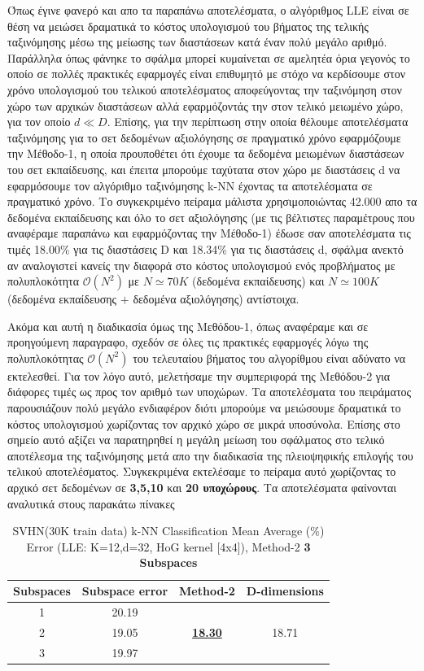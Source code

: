 \par
Όπως έγινε φανερό και απο τα παραπάνω αποτελέσματα, ο αλγόριθμος \textlatin{LLE} είναι σε θέση να μειώσει δραματικά το κόστος υπολογισμού του βήματος της τελικής ταξινόμησης μέσω της μείωσης των διαστάσεων κατά έναν πολύ μεγάλο αριθμό. Παράλληλα όπως φάνηκε το σφάλμα μπορεί κυμαίνεται σε αμελητέα όρια γεγονός το οποίο σε πολλές πρακτικές εφαρμογές είναι επιθυμητό με στόχο να κερδίσουμε στον χρόνο υπολογισμού του τελικού αποτελέσματος αποφεύγοντας την ταξινόμηση στον χώρο των αρχικών διαστάσεων αλλά εφαρμόζοντάς την στον τελικό μειωμένο χώρο, για τον οποίο $d \ll D$. Επίσης, για την περίπτωση στην οποία θέλουμε αποτελέσματα ταξινόμησης για το σετ δεδομένων αξιολόγησης σε πραγματικό χρόνο εφαρμόζουμε την Μέθοδο-1, η οποία προυποθέτει ότι έχουμε τα δεδομένα μειωμένων διαστάσεων του σετ εκπαίδευσης, και έπειτα μπορούμε ταχύτατα στον χώρο με διαστάσεις \textlatin{d} να εφαρμόσουμε τον αλγόριθμο ταξινόμησης \textlatin{k-NN} έχοντας τα αποτελέσματα σε πραγματικό χρόνο. Το συγκεκριμένο πείραμα μάλιστα χρησιμοποιώντας 42.000 απο τα δεδομένα εκπαίδευσης και όλο το σετ αξιολόγησης (με τις βέλτιστες παραμέτρους που αναφέραμε παραπάνω και εφαρμόζοντας την Μέθοδο-1) έδωσε σαν αποτελέσματα τις τιμές 18.00\% για τις διαστάσεις \textlatin{D} και 18.34\% για τις διαστάσεις \textlatin{d}, σφάλμα ανεκτό αν αναλογιστεί κανείς την διαφορά στο κόστος υπολογισμού ενός προβλήματος με πολυπλοκότητα $ \mathcal{O}(N^2)$ με $N \simeq 70K$ (δεδομένα εκπαίδευσης) και $N \simeq 100K$ (δεδομένα εκπαίδευσης $+$ δεδομένα αξιολόγησης) αντίστοιχα.
\par
Ακόμα και αυτή η διαδικασία όμως της Μεθόδου-1, όπως αναφέραμε και σε προηγούμενη παραγραφο, σχεδόν σε όλες τις πρακτικές εφαρμογές λόγω της πολυπλοκότητας $ \mathcal{O}(N^2)$  του τελευταίου βήματος του αλγορίθμου είναι αδύνατο να εκτελεσθεί. Για τον λόγο αυτό, μελετήσαμε την συμπεριφορά της Μεθόδου-2 για διάφορες τιμές ως προς τον αριθμό των υποχώρων. Τα αποτελέσματα του πειράματος παρουσιάζουν πολύ μεγάλο ενδιαφέρον διότι μπορούμε να μειώσουμε δραματικά το κόστος υπολογισμού χωρίζοντας τον αρχικό χώρο σε μικρά υποσύνολα. Επίσης στο σημείο αυτό αξίζει να παρατηρηθεί η μεγάλη μείωση του σφάλματος στο τελικό αποτέλεσμα της ταξινόμησης μετά απο την διαδικασία της πλειοψηφικής επιλογής του τελικού αποτελέσματος. Συγκεκριμένα εκτελέσαμε το πείραμα αυτό χωρίζοντας το αρχικό σετ δεδομένων σε \textbf{3,5,10} και \textbf{20 υποχώρους}. Τα αποτελέσματα φαίνονται αναλυτικά στους παρακάτω πίνακες
\begin{table}[H]
\centering
\label{tab:table15}
\begin{tabular}{|c|c|c|c|}
\hline
\textlatin{Subspaces} & \textlatin{Subspace error} & \textlatin{Method-2} & \textlatin{D-dimensions}  \\
\hline
1 & 20.19 & & \\
2 & 19.05 & \underline{\textbf{18.30}} & 18.71 \\
3 & 19.97 & & \\
\hline
\end{tabular}
\caption{\textlatin{SVHN(30K train data) k-NN Classification Mean Average (\%) Error (LLE: K=12,d=32, HoG kernel [4x4]), Method-2 \textbf{3 Subspaces}}}
\end{table}

